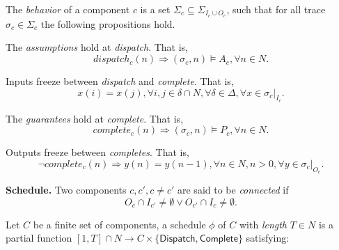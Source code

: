 
The \emph{behavior} of a component $c$ is a set $\Sigma_c \subseteq \Sigma_{I_c \cup O_c}$, such that for all trace $\sigma_c \in \Sigma_c$ the following propositions hold.

The \emph{assumptions} hold at \emph{dispatch}. That is,
\begin{equation} 
\label{eqn:assumption}
	dispatch_c(n) \Rightarrow (\sigma_c, n) \models A_c, \forall n\in N.
\end{equation}

Inputs freeze between \emph{dispatch} and \emph{complete}. That is,
\begin{equation} 
\label{eqn:inputfreeze}
	x(i) = x(j), \forall i,j\in \delta \cap N, \forall \delta \in \Delta, \forall x \in \sigma_c|_{I_c}.
\end{equation}

The \emph{guarantees} hold at \emph{complete}. That is,
\begin{equation} 
\label{eqn:guarantee}
	complete_c(n) \Rightarrow (\sigma_c, n) \models P_c, \forall n\in N.
\end{equation}

Outputs freeze between \emph{completes}. That is,
\begin{equation} 
\label{eqn:outputfreeze}
	\lnot complete_c(n) \Rightarrow y(n) = y(n-1), \forall n \in N, n > 0, \forall y \in \sigma_c|_{O_c}.
\end{equation}

{\bf Schedule.}
Two components $ c, c', c\neq c'$ are said to be \emph{connected} if
\begin{equation*}
	O_c \cap I_{c'} \neq \emptyset \vee O_{c'} \cap I_c \neq \emptyset.
\end{equation*}

Let $C$ be a finite set of components, a schedule $\phi$ of $C$ with \emph{length} $T\in N$ is a partial function $[1, T]  \cap N\rightarrow C\times \{\textsf{Dispatch}, \textsf{Complete}\}$ satisfying:

